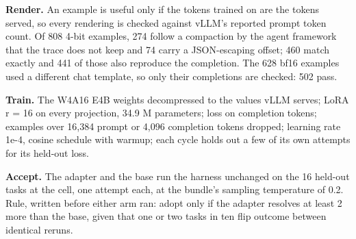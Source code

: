 \documentclass[
  11pt,
  a4paper,
]{article}
\begin{document}
\textbf{Render.} An example is useful only if the tokens trained on are
the tokens served, so every rendering is checked against vLLM's reported
prompt token count. Of 808 4-bit examples, 274 follow a compaction by
the agent framework that the trace does not keep and 74 carry a
JSON-escaping offset; 460 match exactly and 441 of those also reproduce
the completion. The 628 bf16 examples used a different chat template, so
only their completions are checked: 502 pass.

\textbf{Train.} The W4A16 E4B weights decompressed to the values vLLM
serves; LoRA r = 16 on every projection, 34.9 M parameters; loss on
completion tokens; examples over 16,384 prompt or 4,096 completion
tokens dropped; learning rate 1e-4, cosine schedule with warmup; each
cycle holds out a few of its own attempts for its held-out loss.

\textbf{Accept.} The adapter and the base run the harness unchanged on
the 16 held-out tasks at the cell, one attempt each, at the bundle's
sampling temperature of 0.2. Rule, written before either arm ran: adopt
only if the adapter resolves at least 2 more than the base, given that
one or two tasks in ten flip outcome between identical reruns.
\end{document}
